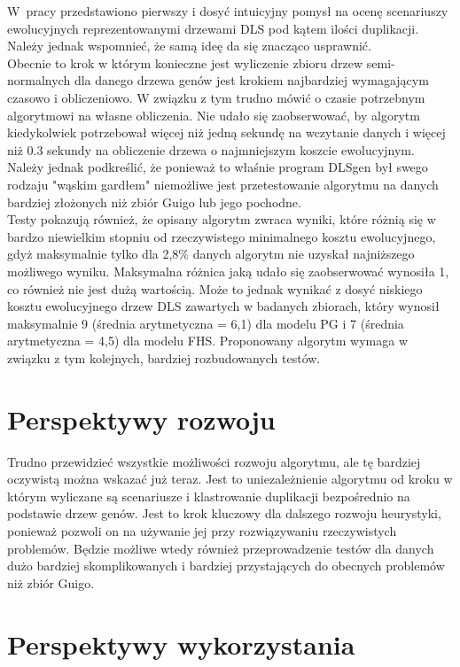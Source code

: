\documentclass[licencjacka]{pracamgr}
\begin{document}
W~pracy przedstawiono pierwszy i dosyć intuicyjny pomysł na ocenę scenariuszy ewolucyjnych reprezentowanymi drzewami DLS pod kątem ilości duplikacji. Należy jednak wspomnieć, że samą ideę da się znacząco usprawnić. 
\\
Obecnie to krok w którym konieczne jest wyliczenie zbioru drzew semi-normalnych dla danego drzewa genów jest krokiem najbardziej wymagającym czasowo i obliczeniowo.  W związku z tym trudno mówić o czasie potrzebnym algorytmowi na własne obliczenia. Nie udało się zaobserwować, by algorytm kiedykolwiek potrzebował więcej niż jedną sekundę na wczytanie danych i więcej niż 0.3 sekundy na obliczenie drzewa o najmniejszym koszcie ewolucyjnym. Należy jednak podkreślić, że ponieważ to właśnie program DLSgen był swego rodzaju "wąskim gardłem"  niemożliwe jest przetestowanie algorytmu na danych bardziej złożonych niż zbiór Guigo lub jego pochodne. 
\\
Testy pokazują również, że opisany algorytm zwraca wyniki, które różnią się w bardzo niewielkim stopniu od rzeczywistego minimalnego kosztu ewolucyjnego, gdyż maksymalnie tylko dla 2,8\% danych algorytm nie uzyskał najniższego możliwego wyniku. Maksymalna różnica jaką udało się zaobserwować wynosiła 1, co również nie jest dużą wartością. Może to jednak wynikać z dosyć niskiego kosztu ewolucyjnego drzew DLS zawartych w badanych zbiorach, który wynosił maksymalnie 9 (średnia arytmetyczna = 6,1) dla modelu PG i 7 (średnia arytmetyczna = 4,5) dla modelu FHS. Proponowany algorytm wymaga w związku z tym kolejnych, bardziej rozbudowanych testów.


\section{Perspektywy rozwoju}

Trudno przewidzieć wszystkie możliwości rozwoju algorytmu, ale tę bardziej
oczywistą można wskazać już teraz.  Jest to uniezależnienie algorytmu od kroku w którym wyliczane są scenariusze i klastrowanie duplikacji bezpośrednio na podstawie drzew genów. Jest to krok kluczowy dla dalszego rozwoju heurystyki, ponieważ pozwoli on na używanie jej przy rozwiązywaniu rzeczywistych problemów. Będzie możliwe wtedy również przeprowadzenie testów dla danych dużo bardziej skomplikowanych i bardziej przystających do obecnych problemów niż zbiór Guigo.

\section{Perspektywy wykorzystania}
\end{document}

